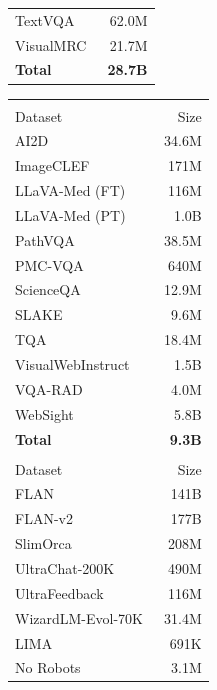 \begin{table}[!h]
\begin{minipage}[t]{0.245\textwidth}
\begin{tabular}{lr}
TextVQA~\cite{singh2019towards} & 62.0M \\
VisualMRC~\cite{tanaka2021visualmrc} & 21.7M \\
\midrule
\textbf{Total} & \textbf{28.7B} \\
\bottomrule
\end{tabular}
\end{minipage}
\hfill
\begin{minipage}[t]{0.245\textwidth}
\centering
\begin{tabular}{lr}
\toprule
\rowcolor{instructcolor}\multicolumn{2}{l}{\textit{Science}} \\
Dataset & Size \\
\midrule
AI2D~\cite{kembhavi2016ai2d} & 34.6M \\
ImageCLEF~\cite{ionescu2024imageclef} & 171M \\
LLaVA-Med (FT)~\cite{li2023llavamed} & 116M \\
LLaVA-Med (PT)~\cite{li2023llavamed} & 1.0B \\
PathVQA~\cite{he2020pathvqa} & 38.5M \\
PMC-VQA~\cite{zhang2023pmcvqa} & 640M \\
ScienceQA~\cite{lu2022learn} & 12.9M \\
SLAKE~\cite{liu2021slake} & 9.6M \\
TQA~\cite{kembhavi2017tqa} & 18.4M \\
VisualWebInstruct~\cite{jia2025visualwebinstruct} & 1.5B \\
VQA-RAD~\cite{lau2018vqarad} & 4.0M \\
WebSight~\cite{laurencon2024unlocking} & 5.8B \\
\midrule
\textbf{Total} & \textbf{9.3B} \\
\midrule
\rowcolor{textcolor}\multicolumn{2}{l}{\textit{Text}} \\
Dataset & Size \\
\midrule
FLAN~\cite{wei2022finetuned} & 141B \\
FLAN-v2~\cite{longpre2023flan} & 177B \\
SlimOrca~\cite{lian2023slimorca} & 208M \\
UltraChat-200K~\cite{ding2023enhancing} & 490M \\
UltraFeedback~\cite{cui2024ultrafeedback} & 116M \\
WizardLM-Evol-70K~\cite{xu2024wizardlm} & 31.4M \\
LIMA~\cite{zhou2023lima} & 691K \\
No Robots~\cite{rajani2023no_robots} & 3.1M \\

\end{tabular}
\end{minipage}
\end{table}

